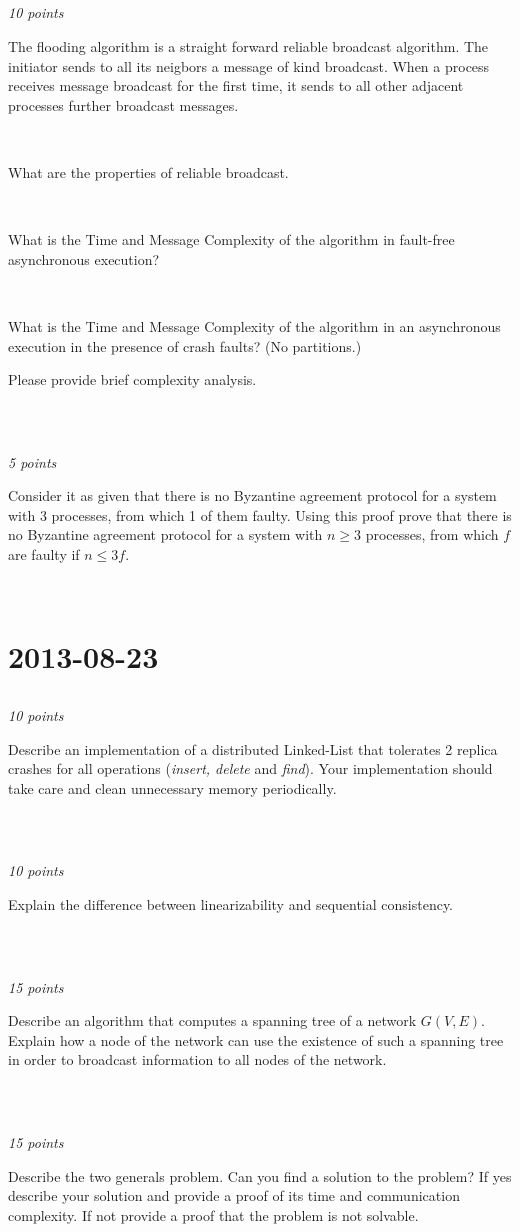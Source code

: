 \documentclass[a4paper]{article}
\newcommand{\points}[1]{\subsection{} \textit{#1 points}\\}
\newcommand{\question}[2][]{
  \parbox[t]{\textwidth}{
    \ifthenelse{\equal{#1}{}}{}{#1)}
    \parbox[t]{0.95\textwidth}{#2}}\\}
\begin{document}
\points{10}
\question{
  The flooding algorithm is a straight forward reliable
  broadcast algorithm. The initiator sends to all its neigbors a
  message of kind broadcast. When a process receives message broadcast
  for the first time, it sends to all other adjacent processes
  further broadcast messages.
}
\question[a]{
  What are the properties of reliable broadcast.
}
\question[b]{
  What is the Time and Message Complexity of the algorithm
  in fault-free asynchronous execution?
}
\question[c]{
  What is the Time and Message Complexity of the algorithm
  in an asynchronous execution in the presence of crash faults? (No
  partitions.)

  Please provide brief complexity analysis.
}

\points{5}
\question{
  Consider it as given that there is no Byzantine agreement
  protocol for a system with 3 processes, from which 1 of them
  faulty. Using this proof prove that there is no Byzantine agreement
  protocol for a system with $n \geq 3$ processes, from which $f$ are
  faulty if $n \leq 3f$.
}

\section{2013-08-23}
\points{10}
\question{Describe an implementation of a distributed
  Linked-List that tolerates 2 replica crashes for all operations
  (\textit{insert, delete} and \textit{find}). Your implementation
  should take care and clean unnecessary memory periodically.}

\points{10}
\label{2013-08:linearizability}
\question{Explain the difference between linearizability
  and sequential consistency.}

\points{15}
\question{Describe an algorithm that computes a spanning
  tree of a network $G(V,E)$. Explain how a node of the network can use
  the existence of such a spanning tree in order to broadcast
  information to all nodes of the network.}

\points{15}
\question{Describe the two generals problem. Can you find
  a solution to the problem? If yes describe your solution and provide a
  proof of its time and communication complexity. If not provide a proof
  that the problem is not solvable. }
\end{document}
